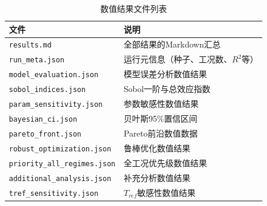 \begin{table}[H]
  \centering
  \caption{数值结果文件列表}
  \label{tab:appendix_json}
  \renewcommand{\arraystretch}{1.05}
  \scriptsize
  \begin{tabularx}{\textwidth}{lX}
    \toprule
    文件 & 说明 \\
    \midrule
    \texttt{results.md} & 全部结果的Markdown汇总 \\
    \texttt{run\_meta.json} & 运行元信息（种子、工况数、$R^2$等） \\
    \texttt{model\_evaluation.json} & 模型误差分析数值结果 \\
    \texttt{sobol\_indices.json} & Sobol一阶与总效应指数 \\
    \texttt{param\_sensitivity.json} & 参数敏感性数值结果 \\
    \texttt{bayesian\_ci.json} & 贝叶斯95\%置信区间 \\
    \texttt{pareto\_front.json} & Pareto前沿数值数据 \\
    \texttt{robust\_optimization.json} & 鲁棒优化数值结果 \\
    \texttt{priority\_all\_regimes.json} & 全工况优先级数值结果 \\
    \texttt{additional\_analysis.json} & 补充分析数值结果 \\
    \texttt{tref\_sensitivity.json} & $T_{ref}$敏感性数值结果 \\
    \bottomrule
  \end{tabularx}
\end{table}
